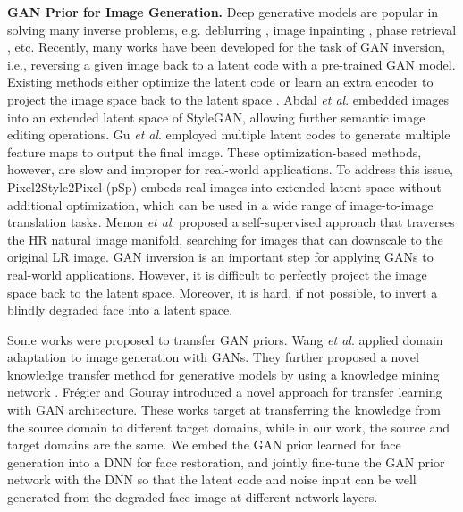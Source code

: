 \documentclass[final]{cvpr}
\begin{document}
\textbf{GAN Prior for Image Generation.}
Deep generative models are popular in solving many inverse problems, e.g. deblurring \cite{Kupyn2017DeblurGAN}, image inpainting \cite{Yu2018Deepfill}, phase retrieval \cite{Hand2018Phase}, etc. Recently, many works have been developed for the task of GAN inversion, i.e., reversing a given image back to a latent code with a pre-trained GAN model. Existing methods either optimize the latent code \cite{Abdal2019Img2StyleGAN} or learn an extra encoder to project the image space back to the latent space \cite{Gu2019Prior,Richardson2020pSp}. Abdal \emph{et al}. \cite{Abdal2019Img2StyleGAN} embedded images into an extended latent space of StyleGAN, allowing further semantic image editing operations. Gu \emph{et al}. \cite{Gu2019Prior} employed multiple latent codes to generate multiple feature maps to output the final image. These optimization-based methods, however, are slow and improper for real-world applications. To address this issue, Pixel2Style2Pixel (pSp) \cite{Richardson2020pSp} embeds real images into extended latent space without additional optimization, which can be used in a wide range of image-to-image translation tasks. Menon \emph{et al}. \cite{Menon2020PULSE} proposed a self-supervised approach that traverses the HR natural image manifold, searching for images that can downscale to the original LR image. GAN inversion is an important step for applying GANs to real-world applications. However, it is difficult to perfectly project the image space back to the latent space. Moreover, it is hard, if not possible, to invert a blindly degraded face into a latent space.

Some works were proposed to transfer GAN priors. Wang \emph{et al}. \cite{Wang2018TransferGAN} applied domain adaptation to image generation with
GANs. They further proposed a novel knowledge transfer method for generative models by using a knowledge mining network \cite{Wang2020MineGAN}. Fr{\'e}gier and Gouray \cite{Frgier2019Mind2MindT} introduced a novel approach for transfer learning with GAN architecture. These works target at transferring the knowledge from the source domain to different target domains, while in our work, the source and target domains are the same. We embed the GAN prior learned for face generation into a DNN for face restoration, and jointly fine-tune the GAN prior network with the DNN so that the latent code and noise input can be well generated from the degraded face image at different network layers.
\end{document}
